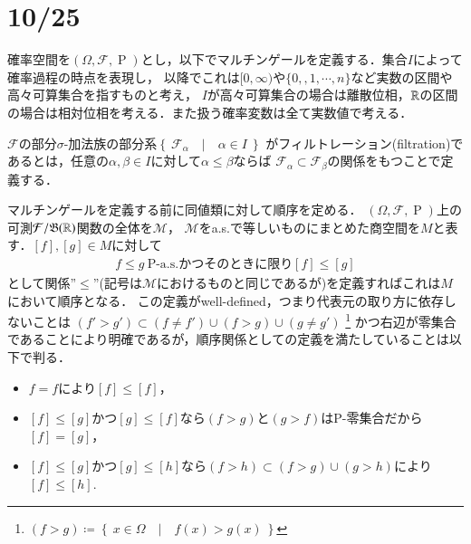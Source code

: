 \section{10/25}
	確率空間を$(\Omega,\mathcal{F},\operatorname{P})$とし，以下でマルチンゲールを定義する．集合$I$によって確率過程の時点を表現し，
	以降でこれは$[0,\infty)$や$\{0,,1,\cdots,n\}$など実数の区間や高々可算集合を指すものと考え，
	$I$が高々可算集合の場合は離散位相，$\mathbb{R}$の区間の場合は相対位相を考える．また扱う確率変数は全て実数値で考える．
	\begin{itembox}[l]{}
		\begin{dfn}[フィルトレーション]
			$\mathcal{F}$の部分$\sigma$-加法族の部分系$\left\{\ \mathcal{F}_\alpha\quad |\quad \alpha \in I\ \right\}$
			がフィルトレーション(filtration)であるとは，任意の$\alpha,\beta \in I$に対して$\alpha \leq \beta$ならば
			$\mathcal{F}_\alpha \subset \mathcal{F}_\beta$の関係をもつことで定義する．
		\end{dfn}
	\end{itembox}
	
	マルチンゲールを定義する前に同値類に対して順序を定める．
	$(\Omega,\mathcal{F},\operatorname{P})$上の可測$\mathcal{F}/\mathfrak{B}(\mathbb{R})$関数の全体を$\mathcal{M}$，
	$\mathcal{M}$をa.s.で等しいものにまとめた商空間を$M$と表す．$[f],[g] \in M$に対して
	\begin{align}
		\mbox{$f \leq g\ $P-a.s.かつそのときに限り$[f] \leq [g]$}
	\end{align}
	として関係''$\leq$''(記号は$\mathcal{M}$におけるものと同じであるが)を定義すればこれは$M$において順序となる．
	この定義がwell-defined，つまり代表元の取り方に依存しないことは
	$(f' > g') \subset (f \neq f') \cup (f > g) \cup (g \neq g')$
	\footnote{$(f > g) \coloneqq \left\{\ x \in \Omega\quad |\quad f(x) > g(x)\ \right\}$}
	かつ右辺が零集合であることにより明確であるが，順序関係としての定義を満たしていることは以下で判る．
	\begin{itemize}
		\item $f=f$により$[f] \leq [f]$，
		\item $[f] \leq [g]$かつ$[g] \leq [f]$なら$(f > g)$と$(g > f)$はP-零集合だから$[f]=[g]$，
		\item $[f] \leq [g]$かつ$[g] \leq [h]$なら$(f > h) \subset (f > g) \cup (g > h)$により$[f]\leq[h]$.
	\end{itemize}
	

